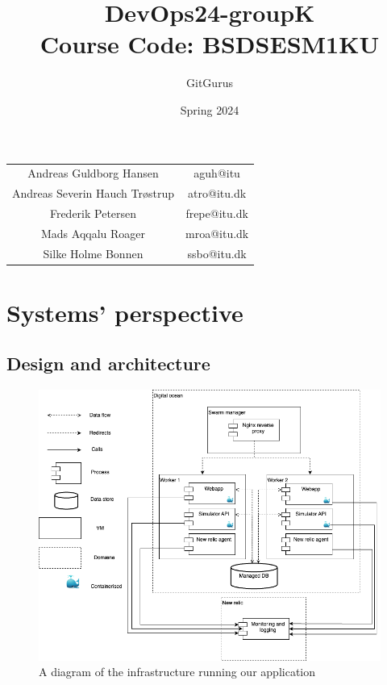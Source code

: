 \documentclass{article}
\title{DevOps24-groupK\\
\large Course Code: BSDSESM1KU}
\author{GitGurus}
\date{Spring 2024}
\begin{document}
\maketitle

\begin{table}[H]
    \centering
    \begin{tabular}{c|c}
    Andreas Guldborg Hansen & aguh@itu \\
    Andreas Severin Hauch Trøstrup & atro@itu.dk \\
    Frederik Petersen & frepe@itu.dk \\
    Mads Aqqalu Roager & mroa@itu.dk \\
    Silke Holme Bonnen & ssbo@itu.dk
    \end{tabular}
\end{table}

\newpage
\tableofcontents

\newpage


\section{Systems' perspective}
\subsection{Design and architecture}
\begin{figure}[H]
    \centering
    \includegraphics[width=\textwidth]{images/devops-overview.png}
    \caption{A diagram of the infrastructure running our application}
    \label{fig:infrastructure}
\end{figure}
\end{document}
